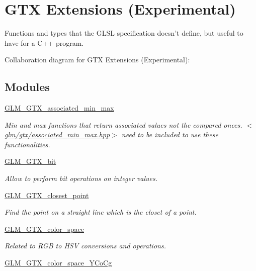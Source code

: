 \hypertarget{group__gtx}{\section{G\-T\-X Extensions (Experimental)}
\label{group__gtx}
}


Functions and types that the G\-L\-S\-L specification doesn't define, but useful to have for a C++ program.  


Collaboration diagram for G\-T\-X Extensions (Experimental)\-:
\subsection*{Modules}
\begin{DoxyCompactItemize}
\item 
\hyperlink{group__gtx__associated__min__max}{G\-L\-M\-\_\-\-G\-T\-X\-\_\-associated\-\_\-min\-\_\-max}
\begin{DoxyCompactList}\small\item\em Min and max functions that return associated values not the compared onces. $<$\hyperlink{associated__min__max_8hpp}{glm/gtx/associated\-\_\-min\-\_\-max.\-hpp}$>$ need to be included to use these functionalities. \end{DoxyCompactList}\item 
\hyperlink{group__gtx__bit}{G\-L\-M\-\_\-\-G\-T\-X\-\_\-bit}
\begin{DoxyCompactList}\small\item\em Allow to perform bit operations on integer values. \end{DoxyCompactList}\item 
\hyperlink{group__gtx__closest__point}{G\-L\-M\-\_\-\-G\-T\-X\-\_\-closest\-\_\-point}
\begin{DoxyCompactList}\small\item\em Find the point on a straight line which is the closet of a point. \end{DoxyCompactList}\item 
\hyperlink{group__gtx__color__space}{G\-L\-M\-\_\-\-G\-T\-X\-\_\-color\-\_\-space}
\begin{DoxyCompactList}\small\item\em Related to R\-G\-B to H\-S\-V conversions and operations. \end{DoxyCompactList}\item 
\hyperlink{group__gtx__color__space___y_co_cg}{G\-L\-M\-\_\-\-G\-T\-X\-\_\-color\-\_\-space\-\_\-\-Y\-Co\-Cg}

\end{DoxyCompactItemize}
